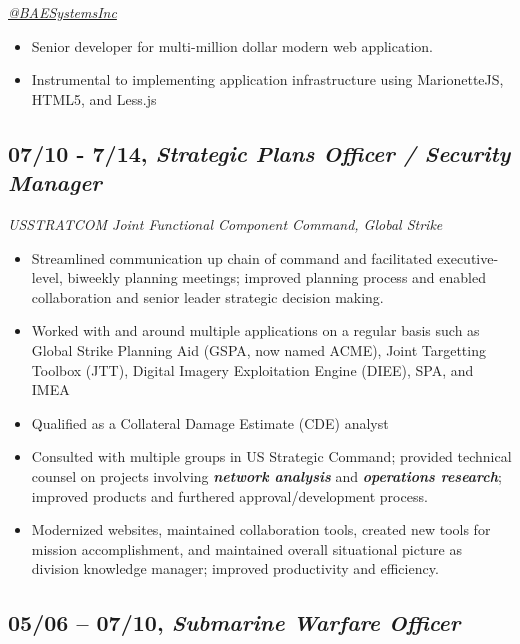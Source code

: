 \documentclass[10pt]{article}
\def\tightlist{}
\begin{document}
\emph{\href{https://twitter.com/BAESystemsInc}{@BAESystemsInc}}

\begin{itemize}
\tightlist
\item
  Senior developer for multi-million dollar modern web application.
\item
  Instrumental to implementing application infrastructure using
  MarionetteJS, HTML5, and Less.js
\end{itemize}

\subsection{\texorpdfstring{07/10 - 7/14, \textbf{\emph{Strategic Plans
Officer / Security
Manager}}}{07/10 - 7/14, Strategic Plans Officer / Security Manager}}\label{strategic-plans-officer-security-manager}

\emph{USSTRATCOM Joint Functional Component Command, Global Strike}

\begin{itemize}
\tightlist
\item
  Streamlined communication up chain of command and facilitated
  executive-level, biweekly planning meetings; improved planning process
  and enabled collaboration and senior leader strategic decision making.
\item
  Worked with and around multiple applications on a regular basis such
  as Global Strike Planning Aid (GSPA, now named ACME), Joint Targetting
  Toolbox (JTT), Digital Imagery Exploitation Engine (DIEE), SPA, and
  IMEA
\item
  Qualified as a Collateral Damage Estimate (CDE) analyst
\item
  Consulted with multiple groups in US Strategic Command; provided
  technical counsel on projects involving \textbf{\emph{network
  analysis}} and \textbf{\emph{operations research}}; improved products
  and furthered approval/development process.
\item
  Modernized websites, maintained collaboration tools, created new tools
  for mission accomplishment, and maintained overall situational picture
  as division knowledge manager; improved productivity and efficiency.
\end{itemize}

\subsection{\texorpdfstring{05/06 -- 07/10, \textbf{\emph{Submarine
Warfare
Officer}}}{05/06 -- 07/10, Submarine Warfare Officer}}\label{submarine-warfare-officer}
\end{document}
